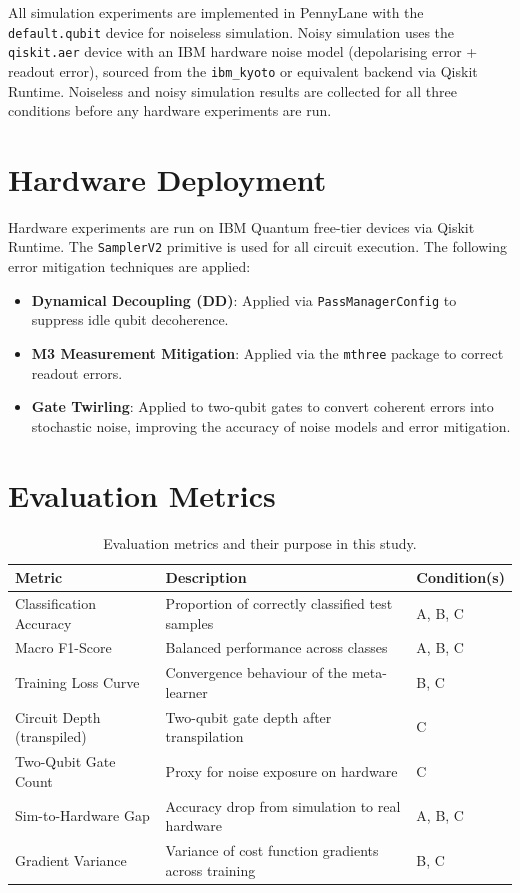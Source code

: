 \documentclass[]{UCD_CS_FYP_Report}
\begin{document}
All simulation experiments are implemented in PennyLane with the \texttt{default.qubit} device for noiseless simulation. Noisy simulation uses the \texttt{qiskit.aer} device with an IBM hardware noise model (depolarising error + readout error), sourced from the \texttt{ibm\_kyoto} or equivalent backend via Qiskit Runtime. Noiseless and noisy simulation results are collected for all three conditions before any hardware experiments are run.

\section{Hardware Deployment}

Hardware experiments are run on IBM Quantum free-tier devices via Qiskit Runtime. The \texttt{SamplerV2} primitive is used for all circuit execution. The following error mitigation techniques are applied:
\begin{itemize}
    \item \textbf{Dynamical Decoupling (DD)}: Applied via \texttt{PassManagerConfig} to suppress idle qubit decoherence.
    \item \textbf{M3 Measurement Mitigation}: Applied via the \texttt{mthree} package to correct readout errors.
    \item \textbf{Gate Twirling}: Applied to two-qubit gates to convert coherent errors into stochastic noise, improving the accuracy of noise models and error mitigation.
\end{itemize}

\section{Evaluation Metrics}

\begin{table}[h]
\centering
\caption{Evaluation metrics and their purpose in this study.}
\label{tab:metrics}
\begin{tabular}{lll}
\toprule
\textbf{Metric} & \textbf{Description} & \textbf{Condition(s)} \\
\midrule
Classification Accuracy & Proportion of correctly classified test samples & A, B, C \\
Macro F1-Score & Balanced performance across classes & A, B, C \\
Training Loss Curve & Convergence behaviour of the meta-learner & B, C \\
Circuit Depth (transpiled) & Two-qubit gate depth after transpilation & C \\
Two-Qubit Gate Count & Proxy for noise exposure on hardware & C \\
Sim-to-Hardware Gap & Accuracy drop from simulation to real hardware & A, B, C \\
Gradient Variance & Variance of cost function gradients across training & B, C \\
\bottomrule
\end{tabular}
\end{table}
\end{document}
